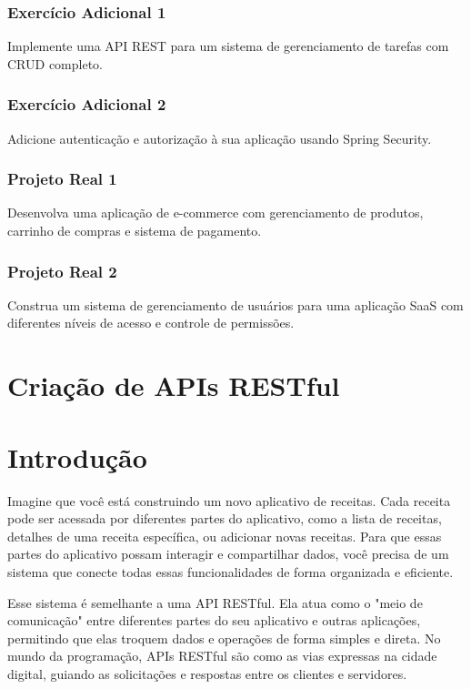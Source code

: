 \documentclass[a4paper,12pt]{book}
\begin{document}
\subsubsection{Exercício Adicional 1}
Implemente uma API REST para um sistema de gerenciamento de tarefas com CRUD completo.

\subsubsection{Exercício Adicional 2}
Adicione autenticação e autorização à sua aplicação usando Spring Security.

\subsubsection{Projeto Real 1}
Desenvolva uma aplicação de e-commerce com gerenciamento de produtos, carrinho de compras e sistema de pagamento.

\subsubsection{Projeto Real 2}
Construa um sistema de gerenciamento de usuários para uma aplicação SaaS com diferentes níveis de acesso e controle de permissões.



\section{Criação de APIs RESTful}

\section{Introdução}
Imagine que você está construindo um novo aplicativo de receitas. Cada receita pode ser acessada por diferentes partes do aplicativo, como a lista de receitas, detalhes de uma receita específica, ou adicionar novas receitas. Para que essas partes do aplicativo possam interagir e compartilhar dados, você precisa de um sistema que conecte todas essas funcionalidades de forma organizada e eficiente.

Esse sistema é semelhante a uma API RESTful. Ela atua como o "meio de comunicação" entre diferentes partes do seu aplicativo e outras aplicações, permitindo que elas troquem dados e operações de forma simples e direta. No mundo da programação, APIs RESTful são como as vias expressas na cidade digital, guiando as solicitações e respostas entre os clientes e servidores.
\end{document}
